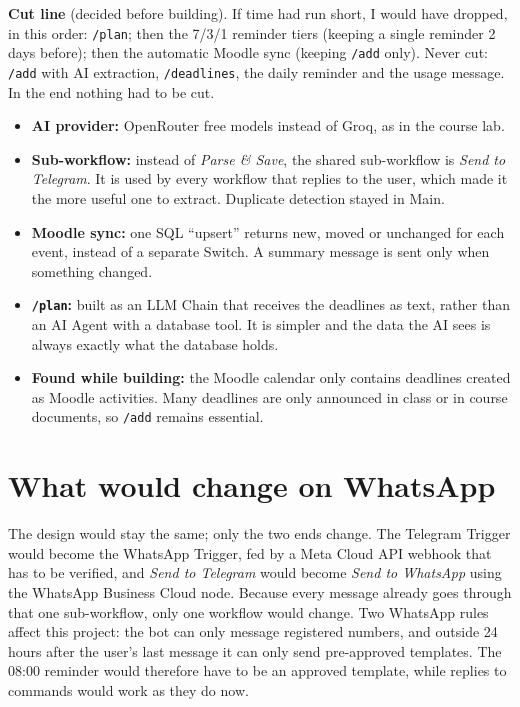 \documentclass[10pt,a4paper]{article}
\newcommand{\cmd}[1]{\texttt{\small #1}}
\begin{document}
\textbf{Cut line} (decided before building). If time had run short, I would have dropped, in this order: \cmd{/plan}; then the 7/3/1 reminder tiers (keeping a single reminder 2 days before); then the automatic Moodle sync (keeping \cmd{/add} only). Never cut: \cmd{/add} with AI extraction, \cmd{/deadlines}, the daily reminder and the usage message. In the end nothing had to be cut.

\begin{itemize}
  \item \textbf{AI provider:} OpenRouter free models instead of Groq, as in the course lab.
  \item \textbf{Sub-workflow:} instead of \emph{Parse \& Save}, the shared sub-workflow is \emph{Send to Telegram}. It
  is used by every workflow that replies to the user, which made it the more useful one to extract. Duplicate detection stayed in Main.
  \item \textbf{Moodle sync:} one SQL ``upsert'' returns new, moved or unchanged for each event, instead of a separate
  Switch. A summary message is sent only when something changed.
  \item \textbf{\cmd{/plan}:} built as an LLM Chain that receives the deadlines as text, rather than an AI Agent with a
  database tool. It is simpler and the data the AI sees is always exactly what the database holds.
  \item \textbf{Found while building:} the Moodle calendar only contains deadlines created as Moodle activities. Many
  deadlines are only announced in class or in course documents, so \cmd{/add} remains essential.
\end{itemize}

\section{What would change on WhatsApp}

The design would stay the same; only the two ends change. The Telegram Trigger would become the WhatsApp Trigger, fed
by a Meta Cloud API webhook that has to be verified, and \emph{Send to Telegram} would become \emph{Send to WhatsApp}
using the WhatsApp Business Cloud node. Because every message already goes through that one sub-workflow, only one
workflow would change. Two WhatsApp rules affect this project: the bot can only message registered numbers, and outside
24 hours after the user's last message it can only send pre-approved templates. The 08:00 reminder would therefore have
to be an approved template, while replies to commands would work as they do now.
\end{document}
